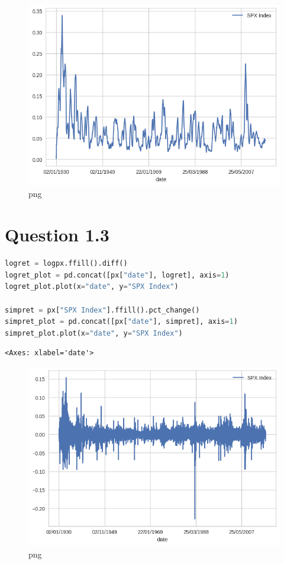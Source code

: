 \begin{figure}
\centering
\includegraphics{ProcessingStockPriceData_files/ProcessingStockPriceData_5_3.png}
\caption{png}
\end{figure}

\hypertarget{question-1.3}{%
\section{Question 1.3}\label{question-1.3}}

\begin{lstlisting}[language=Python]
logret = logpx.ffill().diff()
logret_plot = pd.concat([px["date"], logret], axis=1)
logret_plot.plot(x="date", y="SPX Index")

simpret = px["SPX Index"].ffill().pct_change()
simpret_plot = pd.concat([px["date"], simpret], axis=1)
simpret_plot.plot(x="date", y="SPX Index")
\end{lstlisting}

\begin{lstlisting}
<Axes: xlabel='date'>
\end{lstlisting}

\begin{figure}
\centering
\includegraphics{ProcessingStockPriceData_files/ProcessingStockPriceData_7_1.png}
\caption{png}
\end{figure}


